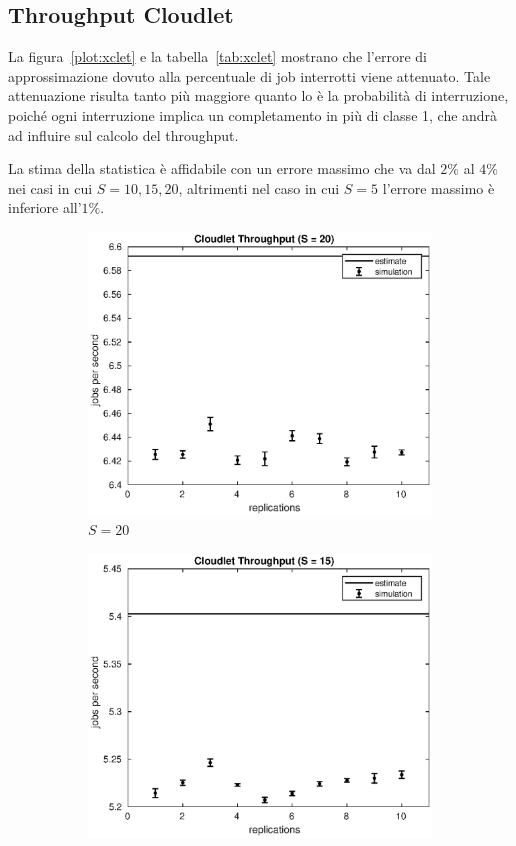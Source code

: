 \subsection{Throughput Cloudlet}
La figura~\ref{plot:xclet} e la tabella~\ref{tab:xclet} mostrano che l'errore
di approssimazione dovuto alla percentuale di job interrotti viene attenuato.
Tale attenuazione risulta tanto più maggiore quanto lo è la probabilità di
interruzione, poiché ogni interruzione implica un completamento in più di classe
1, che andrà ad influire sul calcolo del throughput.

La stima della statistica è affidabile con un errore massimo che va dal $2\%$ al
$4\%$ nei casi in cui $S=10,15,20$, altrimenti nel caso in cui $S=5$ l'errore
massimo è inferiore all'$1\%$.
\begin{figure}[!h]
\centering
%
\begin{subfigure}[t]{0.49\textwidth}
\includegraphics[width=\textwidth]{figures/simul/20_500K_xclet}
\caption{$S = 20$}
\label{20_xclet}
\end{subfigure}
%
\begin{subfigure}[t]{0.49\textwidth}
\includegraphics[width=\textwidth]{figures/simul/15_500K_xclet}

\end{subfigure}
\end{figure}
